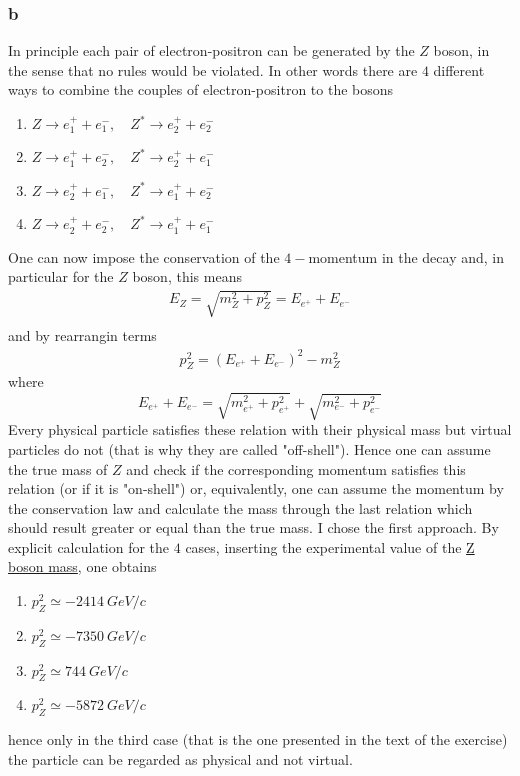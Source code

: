 \subsubsection*{b}
In principle each pair of electron-positron can be generated by the $Z$ boson, in the sense that no rules would be violated. 
In other words there are $4$ different ways to combine the couples of electron-positron to the bosons
\begin{enumerate}
    \item $Z \rightarrow e^+_1 + e^-_1, \quad Z^* \rightarrow e^+_2 + e^-_2$
    \item $Z \rightarrow e^+_1 + e^-_2, \quad Z^* \rightarrow e^+_2 + e^-_1$ 
    \item $Z \rightarrow e^+_2 + e^-_1, \quad Z^* \rightarrow e^+_1 + e^-_2$
    \item $Z \rightarrow e^+_2 + e^-_2, \quad Z^* \rightarrow e^+_1 + e^-_1$
\end{enumerate}
One can now impose the conservation of the $4-$momentum in the decay and, in particular for the $Z$ boson, this means 
\begin{gather*}
    E_Z = \sqrt{m_Z^2 + p_Z^2} = E_{e^+} + E_{e^-} \\
\end{gather*}
and by rearrangin terms
\begin{gather*}
    p_Z^2 = (E_{e^+} + E_{e^-})^2 - m_Z^2
\end{gather*}
where 
\begin{equation*} 
    E_{e^+} + E_{e^-} = \sqrt{m_{e^+}^2 + p_{e^+}^2} + \sqrt{m_{e^-}^2 + p_{e^-}^2}
\end{equation*}
Every physical particle satisfies these relation with their physical mass but virtual particles do not (that is why they are called "off-shell"). Hence one can assume the true mass of $Z$ and check if the corresponding 
momentum satisfies this relation (or if it is "on-shell") or, equivalently, one can assume the momentum by the conservation law and calculate the mass through the last relation 
which should result greater or equal than the true mass. I chose the first approach.
By explicit calculation for the $4$ cases, inserting the experimental value of the \href{https://en.wikipedia.org/wiki/W_and_Z_bosons}{Z boson mass}, one obtains 
\begin{enumerate}
    \item $p_Z^2 \simeq -2414~GeV/c$
    \item $p_Z^2 \simeq -7350~GeV/c$
    \item $p_Z^2 \simeq 744~GeV/c$
    \item $p_Z^2 \simeq  -5872~GeV/c$
\end{enumerate}
hence only in the third case (that is the one presented in the text of the exercise) the particle can be regarded as physical and not virtual.


